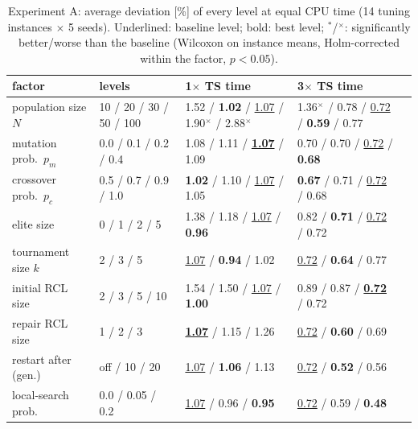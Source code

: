 \begin{table}[t]
\centering\footnotesize
\setlength{\tabcolsep}{3pt}
\caption{Experiment A: average deviation [\%] of every level at equal CPU time (14 tuning instances $\times$ 5 seeds). Underlined: baseline level; bold: best level; $^{*}$/$^{\times}$: significantly better/worse than the baseline (Wilcoxon on instance means, Holm-corrected within the factor, $p<0.05$).}
\label{tab:tuning}
\begin{tabular}{lllll}
\toprule
factor & levels & 1$\times$ TS time & 3$\times$ TS time \\
\midrule
population size $N$ & 10 / 20 / 30 / 50 / 100 & 1.52 / \textbf{1.02} / \underline{1.07} / 1.90$^{\times}$ / 2.88$^{\times}$ & 1.36$^{\times}$ / 0.78 / \underline{0.72} / \textbf{0.59} / 0.77 \\
mutation prob.\ $p_m$ & 0.0 / 0.1 / 0.2 / 0.4 & 1.08 / 1.11 / \underline{\textbf{1.07}} / 1.09 & 0.70 / 0.70 / \underline{0.72} / \textbf{0.68} \\
crossover prob.\ $p_c$ & 0.5 / 0.7 / 0.9 / 1.0 & \textbf{1.02} / 1.10 / \underline{1.07} / 1.05 & \textbf{0.67} / 0.71 / \underline{0.72} / 0.68 \\
elite size & 0 / 1 / 2 / 5 & 1.38 / 1.18 / \underline{1.07} / \textbf{0.96} & 0.82 / \textbf{0.71} / \underline{0.72} / 0.72 \\
tournament size $k$ & 2 / 3 / 5 & \underline{1.07} / \textbf{0.94} / 1.02 & \underline{0.72} / \textbf{0.64} / 0.77 \\
initial RCL size & 2 / 3 / 5 / 10 & 1.54 / 1.50 / \underline{1.07} / \textbf{1.00} & 0.89 / 0.87 / \underline{\textbf{0.72}} / 0.72 \\
repair RCL size & 1 / 2 / 3 & \underline{\textbf{1.07}} / 1.15 / 1.26 & \underline{0.72} / \textbf{0.60} / 0.69 \\
restart after (gen.) & off / 10 / 20 & \underline{1.07} / \textbf{1.06} / 1.13 & \underline{0.72} / \textbf{0.52} / 0.56 \\
local-search prob. & 0.0 / 0.05 / 0.2 & \underline{1.07} / 0.96 / \textbf{0.95} & \underline{0.72} / 0.59 / \textbf{0.48} \\
\bottomrule
\end{tabular}
\end{table}

